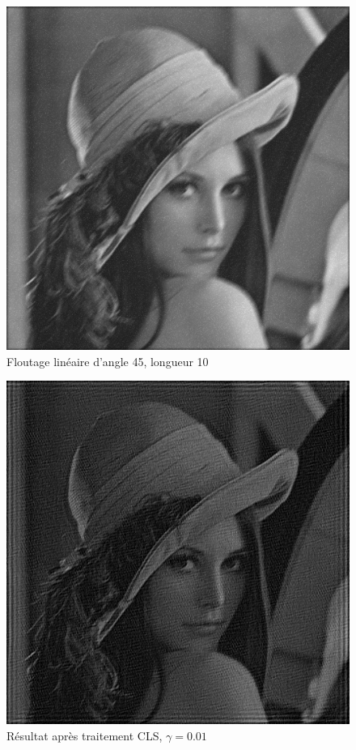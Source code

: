 \documentclass{article}
\begin{document}
	\begin{figure}[!h]
		\begin{center}			
			\includegraphics[scale=0.3]{Img/MLbefore}
		\end{center}
		\caption{Floutage linéaire d'angle 45, longueur 10}
	\end{figure}

	\begin{figure}[!h]
	\begin{center}			
		\includegraphics[scale=0.3]{Img/MLafterg001}
	\end{center}
	\caption{Résultat après traitement CLS, $\gamma = 0.01$}
	\end{figure}
\end{document}
